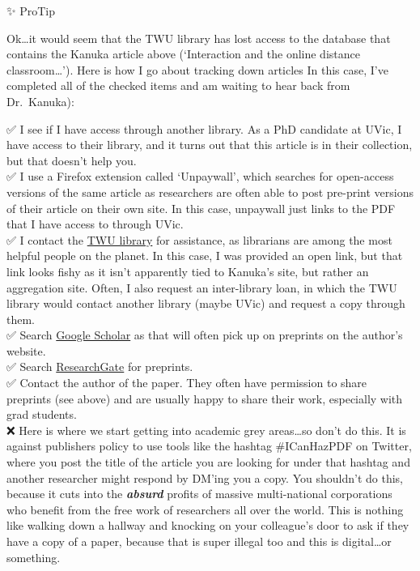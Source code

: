 \documentclass[
]{book}
\begin{document}
\begin{blank}
{✨ ProTip}

Ok\ldots it would seem that the TWU library has lost access to the database that contains the Kanuka article above (`Interaction and the online distance classroom\ldots{}'). Here is how I go about tracking down articles In this case, I've completed all of the checked items and am waiting to hear back from Dr.~Kanuka):

✅ I see if I have access through another library. As a PhD candidate at UVic, I have access to their library, and it turns out that this article is in their collection, but that doesn't help you.\\
✅ I use a Firefox extension called `Unpaywall', which searches for open-access versions of the same article as researchers are often able to post pre-print versions of their article on their own site. In this case, unpaywall just links to the PDF that I have access to through UVic.\\
✅ I contact the \href{https://libguides.twu.ca/help}{TWU library} for assistance, as librarians are among the most helpful people on the planet. In this case, I was provided an open link, but that link looks fishy as it isn't apparently tied to Kanuka's site, but rather an aggregation site. Often, I also request an inter-library loan, in which the TWU library would contact another library (maybe UVic) and request a copy through them.\\
✅ Search \href{https://scholar.google.com}{Google Scholar} as that will often pick up on preprints on the author's website.\\
✅ Search \href{https://www.researchgate.net/}{ResearchGate} for preprints.\\
✅ Contact the author of the paper. They often have permission to share preprints (see above) and are usually happy to share their work, especially with grad students.\\
❌ Here is where we start getting into academic grey areas\ldots so don't do this. It is against publishers policy to use tools like the hashtag \#ICanHazPDF on Twitter, where you post the title of the article you are looking for under that hashtag and another researcher might respond by DM'ing you a copy. You shouldn't do this, because it cuts into the \textbf{\emph{absurd}} profits of massive multi-national corporations who benefit from the free work of researchers all over the world. This is nothing like walking down a hallway and knocking on your colleague's door to ask if they have a copy of a paper, because that is super illegal too and this is digital\ldots or something.


\end{blank}
\end{document}
